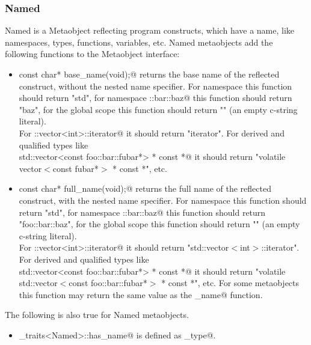 \subsubsection{Named}

{\metaobject Named} is a {\metaobject Metaobject} reflecting program constructs,
which have a name, like namespaces, types, functions, variables, etc. {\metaobject Named}
metaobjects add the following functions to the {\metaobject Metaobject} interface:

\begin{itemize}

	\item{\verb@static const char* base_name(void);@} returns the base name
	of the reflected construct, without the nested name specifier. For namespace
	\verb@std@ this function should return "std", for namespace \verb@foo::bar::baz@
	this function should return "baz", for the global scope this function
	should return "" (an empty c-string literal).\\For \verb@std::vector<int>::iterator@
	it should return "iterator". For derived and qualified types like \\
	\verb@volatile std::vector<const foo::bar::fubar*> * const *@ it should return
	"volatile vector$<$const fubar*$>$ * const *", etc.

	\item{\verb@static const char* full_name(void);@} returns the full name
	of the reflected construct, with the nested name specifier. For namespace
	\verb@std@ this function should return "std", for namespace \verb@foo::bar::baz@
	this function should return "foo::bar::baz", for the global scope this function
	should return "" (an empty c-string literal).\\For \verb@std::vector<int>::iterator@
	it should return "std::vector$<$int$>$::iterator". For derived and qualified types like\\
	\verb@volatile std::vector<const foo::bar::fubar*> * const *@ it should return
	"volatile std::vector$<$const foo::bar::fubar*$>$ * const *", etc. For some
	metaobjects this function may return the same value as the \verb@base_name@ function.
\end{itemize}

The following is also true for {\metaobject Named} metaobjects.

\begin{itemize}
	\item \verb@metaobject_traits<Named>::has_name@ is defined as \verb@true_type@.
\end{itemize}

